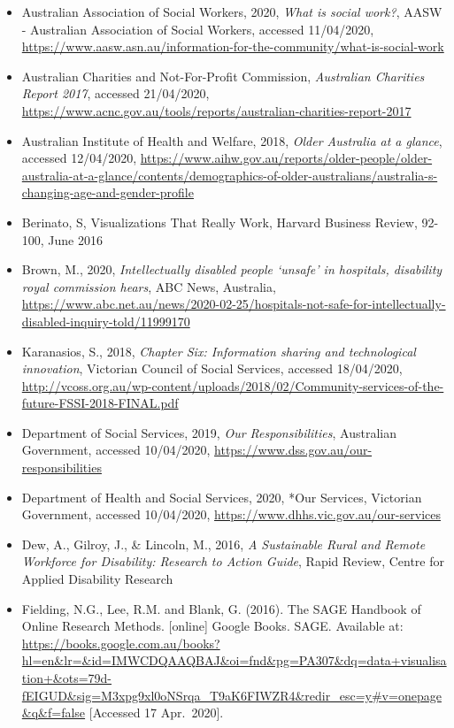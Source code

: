 \documentclass[
  11pt,
]{article}
\begin{document}
\fontsize{11}{14}

\begin{itemize}
\item
  Australian Association of Social Workers, 2020, \emph{What is social work?}, AASW - Australian Association of Social Workers, accessed 11/04/2020, \url{https://www.aasw.asn.au/information-for-the-community/what-is-social-work}
\item
  Australian Charities and Not-For-Profit Commission, \emph{Australian Charities Report 2017}, accessed 21/04/2020, \url{https://www.acnc.gov.au/tools/reports/australian-charities-report-2017}
\item
  Australian Institute of Health and Welfare, 2018, \emph{Older Australia at a glance}, accessed 12/04/2020, \url{https://www.aihw.gov.au/reports/older-people/older-australia-at-a-glance/contents/demographics-of-older-australians/australia-s-changing-age-and-gender-profile}
\item
  Berinato, S, Visualizations That Really Work, Harvard Business Review, 92-100, June 2016
\item
  Brown, M., 2020, \emph{Intellectually disabled people `unsafe' in hospitals, disability royal commission hears}, ABC News, Australia, \url{https://www.abc.net.au/news/2020-02-25/hospitals-not-safe-for-intellectually-disabled-inquiry-told/11999170}
\item
  Karanasios, S., 2018, \emph{Chapter Six: Information sharing and technological innovation}, Victorian Council of Social Services, accessed 18/04/2020, \url{http://vcoss.org.au/wp-content/uploads/2018/02/Community-services-of-the-future-FSSI-2018-FINAL.pdf}
\item
  Department of Social Services, 2019, \emph{Our Responsibilities}, Australian Government, accessed 10/04/2020, \url{https://www.dss.gov.au/our-responsibilities}
\item
  Department of Health and Social Services, 2020, *Our Services, Victorian Government, accessed 10/04/2020, \url{https://www.dhhs.vic.gov.au/our-services}
\item
  Dew, A., Gilroy, J., \& Lincoln, M., 2016, \emph{A Sustainable Rural and Remote Workforce for Disability: Research to Action Guide}, Rapid Review, Centre for Applied Disability Research
\item
  Fielding, N.G., Lee, R.M. and Blank, G. (2016). The SAGE Handbook of Online Research Methods. {[}online{]} Google Books. SAGE. Available at: \url{https://books.google.com.au/books?hl=en\&lr=\&id=IMWCDQAAQBAJ\&oi=fnd\&pg=PA307\&dq=data+visualisation+\&ots=79d-fEIGUD\&sig=M3xpg9xl0oNSrqa_T9aK6FIWZR4\&redir_esc=y\#v=onepage\&q\&f=false} {[}Accessed 17 Apr.~2020{]}.

\end{itemize}
\end{document}
